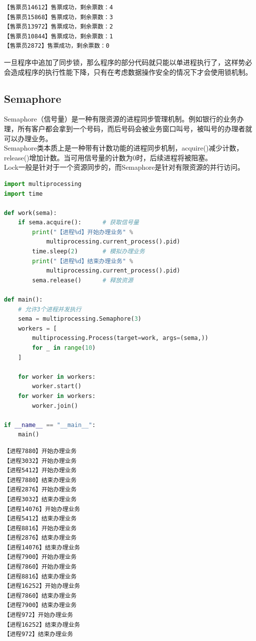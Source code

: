 \begin{tcolorbox}
	\begin{verbatim}
【售票员14612】售票成功，剩余票数：4
【售票员15868】售票成功，剩余票数：3
【售票员13972】售票成功，剩余票数：2
【售票员10844】售票成功，剩余票数：1
【售票员2872】售票成功，剩余票数：0
\end{verbatim}
\end{tcolorbox}

一旦程序中追加了同步锁，那么程序的部分代码就只能以单进程执行了，这样势必会造成程序的执行性能下降，只有在考虑数据操作安全的情况下才会使用锁机制。\\

\subsection{Semaphore}

Semaphore（信号量）是一种有限资源的进程同步管理机制。例如银行的业务办理，所有客户都会拿到一个号码，而后号码会被业务窗口叫号，被叫号的办理者就可以办理业务。\\

Semaphore类本质上是一种带有计数功能的进程同步机制，acquire()减少计数，release()增加计数。当可用信号量的计数为0时，后续进程将被阻塞。\\

Lock一般是针对于一个资源同步的，而Semaphore是针对有限资源的并行访问。\\


\begin{lstlisting}[language=Python]
import multiprocessing
import time

def work(sema):
	if sema.acquire():      # 获取信号量
		print("【进程%d】开始办理业务" % 
			multiprocessing.current_process().pid)
		time.sleep(2)       # 模拟办理业务
		print("【进程%d】结束办理业务" % 
			multiprocessing.current_process().pid)
		sema.release()      # 释放资源

def main():
	# 允许3个进程并发执行
	sema = multiprocessing.Semaphore(3)
	workers = [
		multiprocessing.Process(target=work, args=(sema,))
		for _ in range(10)
	]

	for worker in workers:
		worker.start()
	for worker in workers:
		worker.join()

if __name__ == "__main__":
	main()
\end{lstlisting}

\begin{tcolorbox}
	\begin{verbatim}
【进程7880】开始办理业务
【进程3032】开始办理业务
【进程5412】开始办理业务
【进程7880】结束办理业务
【进程2876】开始办理业务
【进程3032】结束办理业务
【进程14076】开始办理业务
【进程5412】结束办理业务
【进程8816】开始办理业务
【进程2876】结束办理业务
【进程14076】结束办理业务
【进程7900】开始办理业务 
【进程7860】开始办理业务 
【进程8816】结束办理业务 
【进程16252】开始办理业务
【进程7860】结束办理业务
【进程7900】结束办理业务
【进程972】开始办理业务
【进程16252】结束办理业务
【进程972】结束办理业务
\end{verbatim}
\end{tcolorbox}

\newpage